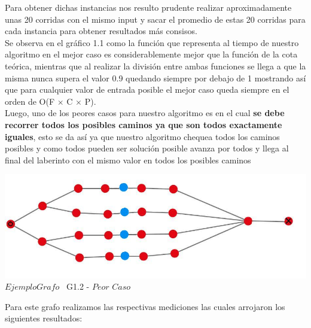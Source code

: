  Para obtener dichas instancias nos resulto prudente realizar aproximadamente unas 20 corridas con el mismo input y sacar el promedio de estas 20 corridas para cada instancia para obtener resultados m\'as consisos.\\ 

Se observa en el gr\'afico 1.1 como la funci\'on que representa al tiempo de nuestro algoritmo en el mejor caso es considerablemente mejor que la funci\'on de la cota te\'orica, mientras que al realizar la divisi\'on entre ambas funciones se llega a que la misma nunca supera el valor 0.9 quedando siempre por debajo de 1 mostrando as\'i que para cualquier valor de entrada posible el mejor caso queda siempre en el orden de  O(F $\times$ C $\times$ P).\\

Luego, uno de los peores casos para nuestro algoritmo es en el cual  \textbf{se debe recorrer todos los posibles caminos ya que son todos exactamente iguales}, esto se da as\'i ya que nuestro algoritmo chequea todos los caminos posibles y como todos pueden ser soluci\'on posible avanza por todos y llega al final del laberinto con el mismo valor en todos los posibles caminos\\

\vspace*{0.3cm} \vspace*{0.3cm}
  \begin{center}
\includegraphics[scale=0.65]{./EJ1/ej1grafopeorcaso.jpeg}
{$Ejemplo Grafo$ \ G1.2 - $Peor$ $Caso$}
  \end{center}
  \vspace*{0.3cm}

Para este grafo realizamos las respectivas mediciones las cuales arrojaron los siguientes resultados:\\


